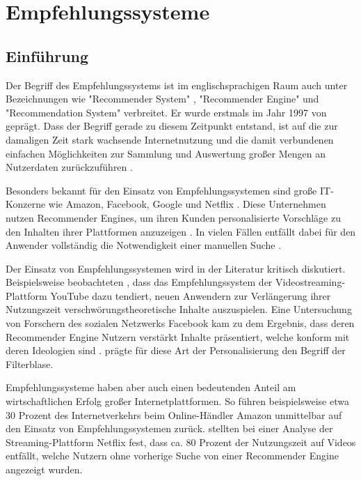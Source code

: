 \chapter{Empfehlungssysteme}
\label{ch:empfehlungssysteme}

\section{Einführung}
\label{ch:empfehlungssysteme:einfuehrung}
Der Begriff des Empfehlungssystems ist im englischsprachigen Raum auch unter Bezeichnungen wie "Recommender System" \cite[S. 1]{lu:2015}, "Recommender Engine" \cite[S. 1]{panigrahi:2016} und "Recommendation System" \cite[S. 1]{ebesu:2018} verbreitet. Er wurde erstmals im Jahr 1997 von \textcite[S. 1]{resnick:1997} geprägt. Dass der Begriff gerade zu diesem Zeitpunkt entstand, ist auf die zur damaligen Zeit stark wachsende Internetnutzung und die damit verbundenen einfachen Möglichkeiten zur Sammlung und Auswertung großer Mengen an Nutzerdaten zurückzuführen \cite[S. xvii]{recommenderSystems:2016}.

Besonders bekannt für den Einsatz von Empfehlungssystemen sind große IT-Konzerne wie Amazon, Facebook, Google und Netflix \cite[S. 1]{zarzour:2018}. Diese Unternehmen nutzen Recommender Engines, um ihren Kunden personalisierte Vorschläge zu den Inhalten ihrer Plattformen anzuzeigen \cite[S. 2]{jeckmans:2013}. In vielen Fällen entfällt dabei für den Anwender vollständig die Notwendigkeit einer manuellen Suche \cite[S. 1]{comibingCareer:2013}.

Der Einsatz von Empfehlungssystemen wird in der Literatur kritisch diskutiert. Beispielsweise beobachteten \textcite[S. 17f.]{alfano:2020}, dass das Empfehlungssystem der Videostreaming-Plattform YouTube dazu tendiert, neuen Anwendern zur Verlängerung ihrer Nutzungszeit verschwörungstheoretische Inhalte auszuspielen. Eine Untersuchung von Forschern des sozialen Netzwerks Facebook kam zu dem Ergebnis, dass deren Recommender Engine Nutzern verstärkt Inhalte präsentiert, welche konform mit deren Ideologien sind \cite[S. 2]{bakshy:2015}. \textcite[S. 1ff.]{pariser:2012} prägte für diese Art der Personalisierung den Begriff der Filterblase.

Empfehlungssysteme haben aber auch einen bedeutenden Anteil am wirtschaftlichen Erfolg großer Internetplattformen. So führen beispielsweise \textcite[S. 6f.]{sharma:2015} etwa 30 Prozent des Internetverkehrs beim Online-Händler Amazon unmittelbar auf den Einsatz von Empfehlungssystemen zurück. \textcite[S. 5]{gomezuribe:2016} stellten bei einer Analyse der Streaming-Plattform Netflix fest, dass ca. 80 Prozent der Nutzungszeit auf Videos entfällt, welche Nutzern ohne vorherige Suche von einer Recommender Engine angezeigt wurden.

